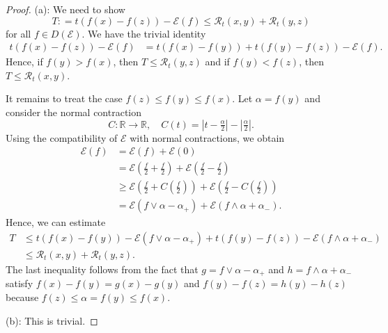 \documentclass[a4paper,11pt,reqno]{amsart}
\theoremstyle{definition}
\numberwithin{equation}{section}
\newcommand{\cR}{{\mathcal R}}
\newcommand{\cE}{{\mathcal E}}
\newcommand{\R}{{\mathbb R}}
\newcommand{\1}{\mathds{1}}
\begin{document}
\begin{proof}
 (a):  We need to show
 $$ T: = t(f(x) - f(z)) - \mathcal{E}(f) \leq \mathcal{R}_t(x,y) + \mathcal{R}_t(y,z) $$
 for all $f \in D(\cE)$. We have the trivial identity
  \begin{align*}
 t(f(x) - f(z)) - \mathcal{E}(f)  & = t(f(x) - f(y)) + t(f(y) -  f(z)) - \mathcal{E}(f).
 \end{align*}
 Hence, if $f(y) > f(x)$, then $T \leq \cR_t(y,z)$ and if $f(y) < f(z)$, then $T \leq \cR_t(x,y)$.
 
 It remains to treat the case $f(z) \leq f(y) \leq f(x)$.  Let $\alpha = f(y)$ and consider the normal contraction 
   $$ C\colon \R\to\R, \quad C(t) = |t - \tfrac{\alpha}{2}| - |\tfrac{\alpha}{2}|. $$
 Using the compatibility of $\cE$ with normal contractions, we obtain
 \begin{align*}
  \mathcal{E}(f) & = \mathcal{E}(f) + \mathcal{E}(0) \\
                 & = \mathcal{E}(\tfrac{f}{2} + \tfrac{f}{2}) + \mathcal{E}(\tfrac{f}{2} - \tfrac{f}{2}) \\
                 & \geq \mathcal{E}(\tfrac{f}{2} + C(\tfrac{f}{2})) + \mathcal{E}(\tfrac{f}{2} - C(\tfrac{f}{2})) \\
                 & = \mathcal{E}(f\vee \alpha - \alpha_+) + \mathcal{E}(f\wedge \alpha + \alpha_-).
 \end{align*}
 Hence, we can estimate 
 \begin{align*}
  T & \leq  t(f(x) - f(y)) - \mathcal{E}(f\vee \alpha - \alpha_+)   + t(f(y) - f(z)) - \mathcal{E}(f\wedge \alpha + \alpha_-) \\
    & \leq \mathcal{R}_t(x,y) + \mathcal{R}_t(y,z).
 \end{align*}
%
The last inequality follows from the fact that $g = f \vee \alpha - \alpha_+$ and $h = f\wedge \alpha + \alpha_-$  satisfy $f(x) - f(y) = g(x) - g(y)$ and $f(y) - f(z) = h(y) - h(z)$ because $f(z) \leq \alpha = f(y) \leq f(x)$. 
%

(b): This is trivial.


\end{proof}
\end{document}
